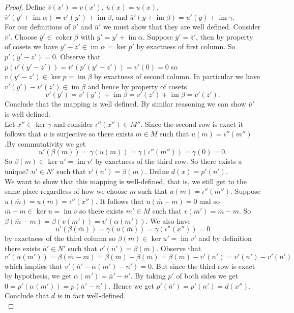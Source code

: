 \documentclass[8pt]{amsart}
\theoremstyle{plain}%
\theoremstyle{definition}
\theoremstyle{remark}
\numberwithin{equation}{section}
\newcommand{\im}{\operatorname{im}}
\newcommand{\coker}{\operatorname{coker}}
\begin{document}
\begin{proof}
	Define $\overline v(x') = v(x')$, $\overline u(x) = u(x)$, $\overline v'(y' + \im \alpha) = v'(y') + \im \beta$, and $\overline u'(y + \im \beta) = u'(y) + \im \gamma$.\\

	For our definitions of $\overline v'$ and $\overline u'$ we must show that they are well defined. Consider $\overline v'$. Choose $\overline y' \in \coker \beta$ with $\overline y' = y' + \im \alpha$. Suppose $\overline y' = \overline z'$, then by property of cosets we have $y' - z' \in \im \alpha = \ker p'$ by exactness of first column. So $p'(y' - z') = 0$. Observe that $p(v'(y' - z')) = \overline v'(p'(y' - z')) = v'(0) = 0$ so $v(y' - z') \in \ker p= \im \beta$ by exactness of second column. In particular we have $v'(y') -v'(z') \in \im \beta$ and hence by property of cosets $$\overline v'(\overline y') = v'(y') + \im \beta = v'(z') + \im \beta = \overline v'(\overline z').$$ Conclude that the mapping is well defined. By similar reasoning we can show $\overline u'$ is well defined.\\

	Let $x'' \in \ker \gamma$ and consider $\iota''(x'') \in M''$. Since the second row is exact it follows that $u$ is surjective so there exists $m \in M$ such that $\boxed{u(m) = \iota''(m'')}$.By commutativity we get $$u'(\beta(m)) = \gamma(u(m)) = \gamma(\iota''(m'')) = \gamma(0) = 0.$$ So $\beta(m) \in \ker u' = \im v'$ by exactness of the third row. So there exists {\color{red} a unique?} $n' \in N'$ such that $\boxed{v'(n') = \beta(m)}$. Define $\boxed{d(x) = p'(n')}$. \\

We want to show that this mapping is well-defined, that is, we still get to the same place regardless of how we choose $m$ such that $u(m) = \iota''(m'')$. Suppose $u (\overline m) = u(m) = \iota''(x'')$. It follows that $u(\overline m - m) = 0$ and so $\overline m - m \in \ker u = \im v$ so there exists $m' \in M$ such that $v(m') = \overline m - m$. So $\beta(\overline m - m) = \beta(v(m')) = v'(\alpha(m'))$. We also have $$u'(\beta(\overline m)) = \gamma(u(\overline m)) = \gamma(\iota''(x'')) = 0$$ by exactness of the third column so $\beta(\overline m) \in \ker u' = \im v'$ and by definition there exists $\overline n' \in N'$ such that $v'(\overline n') = \beta(\overline m)$. Observe that $$v'(\alpha(m')) = \beta(\overline m - m) = \beta(\overline m) - \beta(m) = \beta(\overline m) - v'(n') = v'(\overline n') - v'(n')$$ which implies that $v'(\overline n' - \alpha(m') - n') = 0$. But since the third row is exact by hypothesis, we get $\alpha(m') = \overline n' - n'$. By taking $p'$ of both sides we get $0 = p'(\alpha(m')) = p(\overline n' - n')$. Hence we get $p'(\overline n') = p'(n') = d(x'')$. Conclude that $d$ is in fact well-defined.\\


\end{proof}
\end{document}
